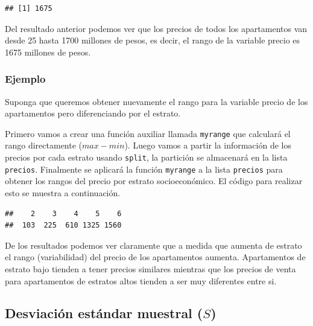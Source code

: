 \documentclass[10pt,]{krantz}
\makeatletter
\newenvironment{Shaded}{\begin{snugshade}}{\end{snugshade}}
\newcommand{\KeywordTok}[1]{\textcolor[rgb]{0.13,0.29,0.53}{\textbf{#1}}}
\newcommand{\DataTypeTok}[1]{\textcolor[rgb]{0.13,0.29,0.53}{#1}}
\newcommand{\StringTok}[1]{\textcolor[rgb]{0.31,0.60,0.02}{#1}}
\newcommand{\ControlFlowTok}[1]{\textcolor[rgb]{0.13,0.29,0.53}{\textbf{#1}}}
\newcommand{\OperatorTok}[1]{\textcolor[rgb]{0.81,0.36,0.00}{\textbf{#1}}}
\newcommand{\NormalTok}[1]{#1}
\newenvironment{kframe}{%
\medskip{}
\setlength{\fboxsep}{.8em}
 \def\at@end@of@kframe{}%
 \ifinner\ifhmode%
  \def\at@end@of@kframe{\end{minipage}}%
  \begin{minipage}{\columnwidth}%
 \fi\fi%
 \def\FrameCommand##1{\hskip\@totalleftmargin \hskip-\fboxsep
 \colorbox{shadecolor}{##1}\hskip-\fboxsep
     \hskip-\linewidth \hskip-\@totalleftmargin \hskip\columnwidth}%
 \MakeFramed {\advance\hsize-\width
   \@totalleftmargin\z@ \linewidth\hsize
   \@setminipage}}%
 {\par\unskip\endMakeFramed%
 \at@end@of@kframe}
\renewenvironment{Shaded}{\begin{kframe}}{\end{kframe}}
\makeatother
\begin{document}
\begin{verbatim}
## [1] 1675
\end{verbatim}

Del resultado anterior podemos ver que los precios de todos los
apartamentos van desde 25 hasta 1700 millones de pesos, es decir, el
rango de la variable precio es 1675 millones de pesos.

\subsubsection*{Ejemplo}\label{ejemplo-21}

Suponga que queremos obtener nuevamente el rango para la variable precio
de los apartamentos pero diferenciando por el estrato.

Primero vamos a crear una función auxiliar llamada \texttt{myrange} que
calculará el rango directamente (\(max - min\)). Luego vamos a partir la
información de los precios por cada estrato usando \texttt{split}, la
partición se almacenará en la lista \texttt{precios}. Finalmente se
aplicará la función \texttt{myrange} a la lista \texttt{precios} para
obtener los rangos del precio por estrato socioeconómico. El código para
realizar esto se muestra a continuación.

\begin{Shaded}
\end{Shaded}

\begin{verbatim}
##    2    3    4    5    6 
##  103  225  610 1325 1560
\end{verbatim}

De los resultados podemos ver claramente que a medida que aumenta de
estrato el rango (variabilidad) del precio de los apartamentos aumenta.
Apartamentos de estrato bajo tienden a tener precios similares mientras
que los precios de venta para apartamentos de estratos altos tienden a
ser muy diferentes entre si.

\subsection{\texorpdfstring{Desviación estándar muestral (\(S\))
}{Desviación estándar muestral (S)  }}\label{desviacion-estandar-muestral-s}
\end{document}
